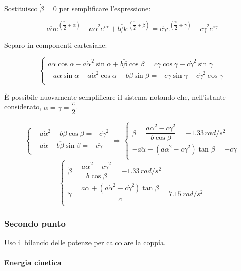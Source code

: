 \documentclass[main.tex]{subfiles}
\begin{document}
Sostituisco $\dot{\beta}=0$ per semplificare l'espressione:

\[
a\ddot{\alpha}e^{\left( \dfrac{\pi}{2} + \alpha \right )} - a\dot{\alpha}^2e^{i\alpha} + b\ddot{\beta}e^{\left( \dfrac{\pi}{2} + \beta \right )}=  c\ddot{\gamma}e^{\left( \dfrac{\pi}{2} + \gamma \right )}  - c\dot{\gamma}^2e^{i\gamma}
\]

Separo in componenti cartesiane:

\[
\begin{cases}
a\ddot{\alpha}\cos\alpha - a\dot{\alpha}^2\sin\alpha + b\ddot{\beta}\cos\beta = c\ddot{\gamma}\cos\gamma - c\dot{\gamma}^2\sin\gamma\\
-a\ddot{\alpha}\sin\alpha - a\dot{\alpha}^2\cos\alpha - b\ddot{\beta}\sin\beta = -c\ddot{\gamma}\sin\gamma - c\dot{\gamma}^2\cos\gamma\\
\end{cases}
\]

È possibile nuovamente semplificare il sistema notando che, nell'istante considerato, $\alpha = \gamma = \dfrac{\pi}{2}$.

\[
\begin{cases}
- a\dot{\alpha}^2 + b\ddot{\beta}\cos\beta =  - c\dot{\gamma}^2\\
-a\ddot{\alpha} - b\ddot{\beta}\sin\beta = -c\ddot{\gamma}\\
\end{cases}
\Longrightarrow
\begin{cases}
\ddot{\beta} =  \dfrac{a\dot{\alpha}^2 - c\dot{\gamma}^2}{b\cos\beta} = -1.33\,rad/s^2\\
-a\ddot{\alpha} - (a\dot{\alpha}^2 - c\dot{\gamma}^2)\tan\beta = -c\ddot{\gamma}\\
\end{cases}
\]
\[
\begin{cases}
\ddot{\beta} =  \dfrac{a\dot{\alpha}^2 - c\dot{\gamma}^2}{b\cos\beta} = -1.33\,rad/s^2\\
\ddot{\gamma} = \dfrac{a\ddot{\alpha} + (a\dot{\alpha}^2 - c\dot{\gamma}^2)\tan\beta}{c} = 7.15\,rad/s^2\\
\end{cases}
\]

\subsubsection{Secondo punto}
Uso il bilancio delle potenze per calcolare la coppia.

\paragraph{Energia cinetica}
\end{document}
